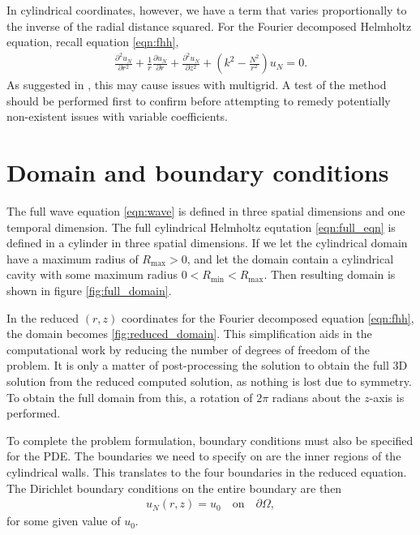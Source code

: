 In cylindrical coordinates, however, we have a term that varies proportionally to the inverse of the radial distance squared.
For the Fourier decomposed Helmholtz equation, recall equation \eqref{eqn:fhh},
\begin{align}
	\frac{\partial^2 u_N}{\partial r^2}
			 + \frac{1}{r} \frac{\partial u_N}{\partial r}
			 + \frac{\partial^2 u_N}{\partial z^2}
			 + (k^2 - \frac{N^2}{r^2})u_N = 0. \label{eqn:full_fhh}
\end{align}
As suggested in \cite{briggs}, this may cause issues with multigrid.
A test of the method should be performed first to confirm before attempting to remedy potentially non-existent issues with variable coefficients.










\section{Domain and boundary conditions}

The full wave equation \eqref{eqn:wave} is defined in three spatial dimensions and one temporal dimension.
The full cylindrical Helmholtz equtation \eqref{eqn:full_eqn} is defined in a cylinder in three spatial dimensions.
If we let the cylindrical domain have a maximum radius of $R_{\mathrm{max}} > 0$, and let the domain contain a cylindrical cavity with some maximum radius $0<R_{\mathrm{min}}<R_\mathrm{max}$.
Then resulting domain is shown in figure \ref{fig:full_domain}.

In the reduced $(r,z)$ coordinates for the Fourier decomposed equation \eqref{eqn:fhh}, the domain becomes \ref{fig:reduced_domain}.
This simplification aids in the computational work by reducing the number of degrees of freedom of the problem.
It is only a matter of post-processing the solution to obtain the full 3D solution from the reduced computed solution, as nothing is lost due to symmetry.
To obtain the full domain from this, a rotation of $2\pi$ radians about the $z$-axis is performed.

To complete the problem formulation, boundary conditions must also be specified for the PDE.
The boundaries we need to specify on are the inner regions of the cylindrical walls.
This translates to the four boundaries in the reduced equation.
The Dirichlet boundary conditions on the entire boundary are then
\begin{align}
	u_N(r,z) = u_0 \quad \mathrm{on} \quad \partial \Omega,
\end{align}
for some given value of $u_0$.



